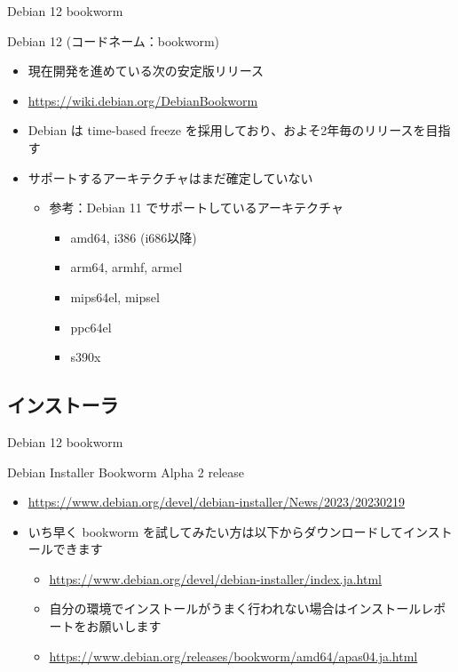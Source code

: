 \begin{frame}{Debian 12 bookworm}%

Debian 12 (コードネーム：bookworm)

\begin{itemize}
\item 現在開発を進めている次の安定版リリース
\item \url{https://wiki.debian.org/DebianBookworm}
\item Debian は time-based freeze を採用しており、およそ2年毎のリリースを目指す
\item サポートするアーキテクチャはまだ確定していない
  \begin{itemize}
  \item 参考：Debian 11 でサポートしているアーキテクチャ
    \begin{itemize}
    \item amd64, i386 (i686以降)
    \item arm64, armhf, armel
    \item mips64el, mipsel
    \item ppc64el
    \item s390x
    \end{itemize}
  \end{itemize}
\end{itemize}
  \begin{center}
  \end{center}
\end{frame}


\subsection{インストーラ}


\begin{frame}{Debian 12 bookworm}%

Debian Installer Bookworm Alpha 2 release

\begin{itemize}
  \item \url{https://www.debian.org/devel/debian-installer/News/2023/20230219}
  \item いち早く bookworm を試してみたい方は以下からダウンロードしてインストールできます
    \begin{itemize}
    \item \url{https://www.debian.org/devel/debian-installer/index.ja.html}
    \item 自分の環境でインストールがうまく行われない場合はインストールレポートをお願いします
    \item \url{https://www.debian.org/releases/bookworm/amd64/apas04.ja.html} 
  \end{itemize}
\end{itemize}

\end{frame}


